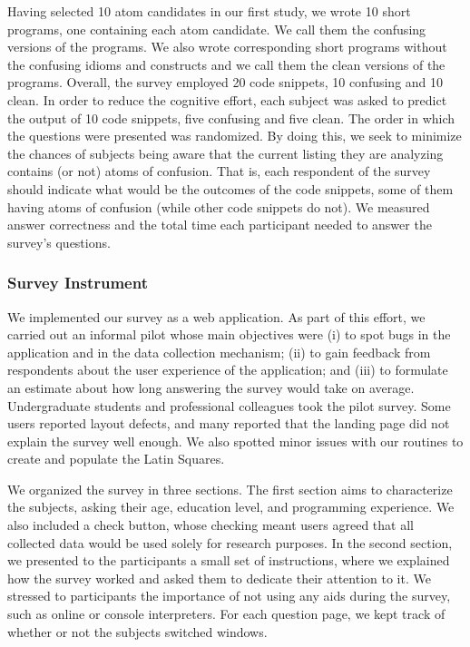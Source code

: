 Having selected 10 atom candidates in our first study, we wrote 10 short programs, one containing each atom candidate. We call them the confusing versions of the programs. We also wrote corresponding short programs without the confusing idioms and constructs and we call them the clean versions of the programs. Overall, the survey employed 20 code snippets, 10 confusing and 10 clean. In order to reduce the cognitive effort, each subject was asked to predict the output of 10 code snippets, five confusing and five clean. The order in which the questions were presented was randomized. By doing this, we seek to minimize the chances of subjects being aware that the current listing they are analyzing contains (or not) atoms of confusion. That is, each respondent of the survey should indicate what would be the outcomes of the code snippets, some of them having atoms of confusion (while other code snippets do not).  We measured answer correctness and the total time each participant needed to answer the survey's questions.

\subsubsection*{Survey Instrument} 

We implemented our survey as a web application. As part of this effort, we carried out an informal pilot whose main objectives were (i) to spot bugs in the application and in the data collection mechanism; (ii) to gain feedback from respondents about the user experience of the application; and (iii) to formulate an estimate about how long answering the survey would take on average. Undergraduate students and professional colleagues took the pilot survey. Some users reported layout defects, and many reported that the landing page did not explain the survey well enough. We also spotted minor issues with our routines to create and populate the Latin Squares. 

We organized the survey in three sections. The first section aims to characterize the subjects, asking their age, education level, and programming experience. We also included a check button, whose checking meant users agreed that all collected data would be used solely for research purposes. In the second section, we presented to the participants a small set of instructions, where we explained how the survey worked and asked them to dedicate their attention to it. We stressed to participants the importance of not using any aids during the survey, such as online or console interpreters. For each question page, we kept track of whether or not the subjects switched windows. 

